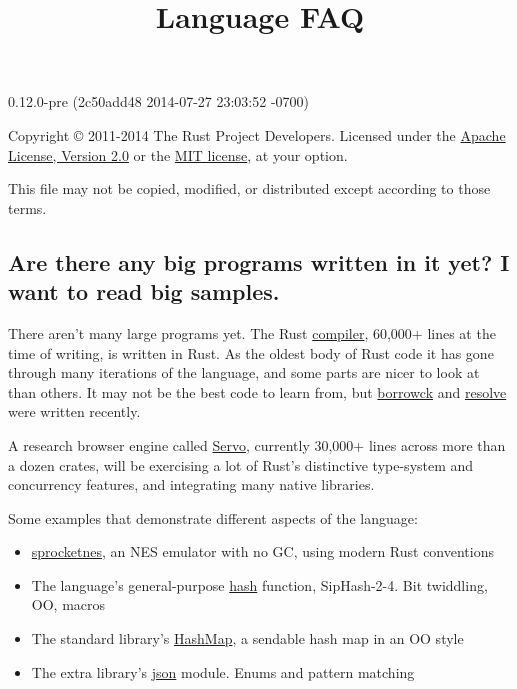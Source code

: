 \documentclass[]{article}
\title{Language FAQ}
\begin{document}
\maketitle

0.12.0-pre (2c50add48 2014-07-27 23:03:52 -0700)

Copyright © 2011-2014 The Rust Project Developers. Licensed under the
\href{http://www.apache.org/licenses/LICENSE-2.0}{Apache License,
Version 2.0} or the \href{http://opensource.org/licenses/MIT}{MIT
license}, at your option.

This file may not be copied, modified, or distributed except according
to those terms.

{
\hypersetup{linkcolor=black}
\setcounter{tocdepth}{3}
\tableofcontents
}
\subsection{Are there any big programs written in it yet? I want to read
big
samples.}\label{are-there-any-big-programs-written-in-it-yet-i-want-to-read-big-samples.}

There aren't many large programs yet. The Rust
\href{https://github.com/rust-lang/rust/tree/master/src/librustc}{compiler},
60,000+ lines at the time of writing, is written in Rust. As the oldest
body of Rust code it has gone through many iterations of the language,
and some parts are nicer to look at than others. It may not be the best
code to learn from, but
\href{https://github.com/rust-lang/rust/blob/master/src/librustc/middle/borrowck/}{borrowck}
and
\href{https://github.com/rust-lang/rust/blob/master/src/librustc/middle/resolve.rs}{resolve}
were written recently.

A research browser engine called
\href{https://github.com/mozilla/servo}{Servo}, currently 30,000+ lines
across more than a dozen crates, will be exercising a lot of Rust's
distinctive type-system and concurrency features, and integrating many
native libraries.

Some examples that demonstrate different aspects of the language:

\begin{itemize}
\itemsep1pt\parskip0pt
\item
  \href{https://github.com/pcwalton/sprocketnes}{sprocketnes}, an NES
  emulator with no GC, using modern Rust conventions
\item
  The language's general-purpose
  \href{https://github.com/rust-lang/rust/blob/master/src/libstd/hash/mod.rs}{hash}
  function, SipHash-2-4. Bit twiddling, OO, macros
\item
  The standard library's
  \href{https://github.com/rust-lang/rust/blob/master/src/libcollections/hashmap.rs}{HashMap},
  a sendable hash map in an OO style
\item
  The extra library's
  \href{https://github.com/rust-lang/rust/blob/master/src/libserialize/json.rs}{json}
  module. Enums and pattern matching
\end{itemize}
\end{document}
